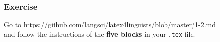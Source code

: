 %
%
%
%
%
%
%


\begin{frame}[fragile]
\frametitle{Exercise}

Go to \url{https://github.com/langsci/latex4linguists/blob/master/1-2.md}\\
and follow the instructions of the \textbf{five blocks} in your \texttt{.tex} file.

\end{frame}


%
%
%


%	
%	
%	
%
%
%
